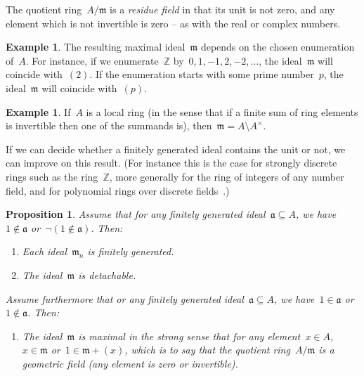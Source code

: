 \documentclass[oneside,reqno]{amsart}
\theoremstyle{definition}
\newtheorem{ex}[defn]{Example}
\theoremstyle{plain}
\newtheorem{prop}[defn]{Proposition}
\theoremstyle{remark}
\newcommand{\aaa}{\mathfrak{a}}
\newcommand{\mmm}{\mathfrak{m}}
\newcommand{\ZZ}{\mathbb{Z}}
\renewcommand{\_}{\mathpunct{.}\,}
\begin{document}
The quotient ring~$A/\mmm$ is a \emph{residue field} in that its unit is not
zero, and any element which is not invertible is zero -- as with the real or
complex numbers.

\begin{ex}The resulting maximal ideal~$\mmm$ depends on the chosen enumeration
of~$A$. For instance, if we enumerate~$\ZZ$ by~$0,1,-1,2,-2,\ldots$, the
ideal~$\mmm$ will coincide with~$(2)$. If the enumeration starts with some
prime number~$p$, the ideal~$\mmm$ will coincide with~$(p)$.\end{ex}

\begin{ex}If~$A$ is a local ring (in the sense that if a finite sum of ring
elements is invertible then one of the summands is), then~$\mmm = A \setminus
A^\times$.\end{ex}

If we can decide whether a finitely generated ideal contains the
unit or not, we can improve on this result. (For instance this is the case for
strongly discrete rings such as the ring~$\ZZ$, more generally for the ring of
integers of any number field, and for polynomial rings over discrete
fields~\cite[Theorem~VIII.1.5]{mines-richman-ruitenburg:constructive-algebra}.)

\begin{prop}\label{prop:with-test}
Assume that for any finitely generated ideal~$\aaa \subseteq A$, we have~$1
\not\in \aaa$ or~$\neg(1 \not\in \aaa)$. Then:
\begin{enumerate}
\item Each ideal~$\mmm_n$ is finitely generated.
\item The ideal~$\mmm$ is detachable.
\end{enumerate}
Assume furthermore that or any finitely generated ideal~$\aaa \subseteq
A$, we have~$1 \in \aaa$ or~$1 \not\in \aaa$. Then:
\begin{enumerate}
\addtocounter{enumi}{2}
\item The ideal~$\mmm$ is maximal in the strong sense that for any element~$x
\in A$,~$x \in \mmm$ or~$1 \in \mmm + (x)$, which is to say that the quotient ring~$A/\mmm$ is a
\emph{geometric field} (any element is zero or invertible).
\end{enumerate}
\end{prop}
\end{document}
